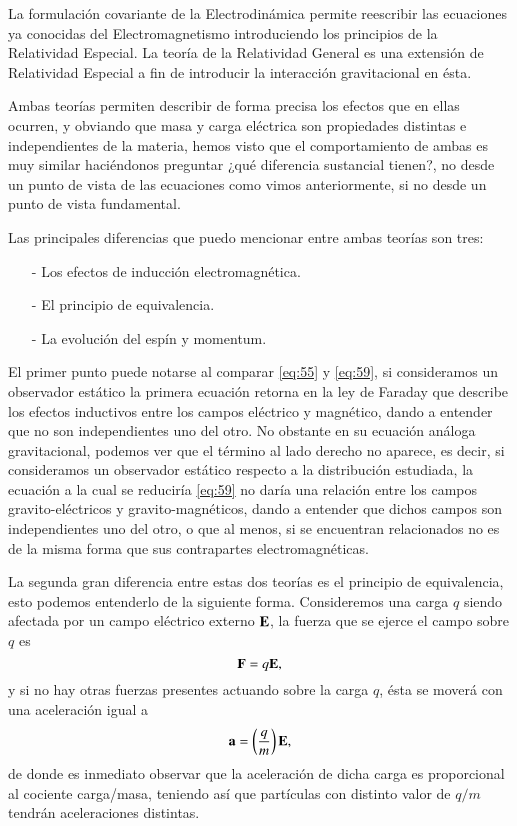La formulación covariante de la Electrodinámica permite reescribir las ecuaciones ya conocidas del Electromagnetismo introduciendo los principios de la Relatividad Especial. La teoría de la Relatividad General es una extensión de Relatividad Especial a fin de introducir la interacción gravitacional en ésta.

Ambas teorías permiten describir de forma precisa los efectos que en ellas ocurren, y obviando que masa y carga eléctrica son propiedades distintas e independientes de la materia, hemos visto que el comportamiento de ambas es muy similar haciéndonos preguntar ¿qué diferencia sustancial tienen?, no desde un punto de vista de las ecuaciones como vimos anteriormente, si no desde un punto de vista fundamental.

Las principales diferencias que puedo mencionar entre ambas teorías son tres:
\begin{itemize}
\item[-] Los efectos de inducción electromagnética.
\item[-] El principio de equivalencia.
\item[-] La evolución del espín y momentum.
\end{itemize}

El primer punto puede notarse al comparar \eqref{eq:55} y \eqref{eq:59}, si consideramos un observador estático la primera ecuación retorna en la ley de Faraday que describe los efectos inductivos entre los campos eléctrico y magnético, dando a entender que no son independientes uno del otro. No obstante en su ecuación análoga gravitacional, podemos ver que el término al lado derecho no aparece, es decir, si consideramos un observador estático respecto a la distribución estudiada, la ecuación a la cual se reduciría \eqref{eq:59} no daría una relación entre los campos gravito-eléctricos y gravito-magnéticos, dando a entender que dichos campos son independientes uno del otro, o que al menos, si se encuentran relacionados no es de la misma forma que sus contrapartes electromagnéticas.

La segunda gran diferencia entre estas dos teorías es el principio de equivalencia, esto podemos entenderlo de la siguiente forma. Consideremos una carga $q$ siendo afectada por un campo eléctrico externo $\vb{E}$, la fuerza que se ejerce el campo sobre $q$ es
\begin{equation}
\vb{F} = q \vb{E},
\end{equation}
y si no hay otras fuerzas presentes actuando sobre la carga $q$, ésta se moverá con una aceleración igual a
\begin{equation}
\vb{a} = \left( \frac{q}{m} \right) \vb{E},
\end{equation}
de donde es inmediato observar que la aceleración de dicha carga es proporcional al cociente carga/masa, teniendo así que partículas con  distinto valor de $q/m$ tendrán aceleraciones distintas.

